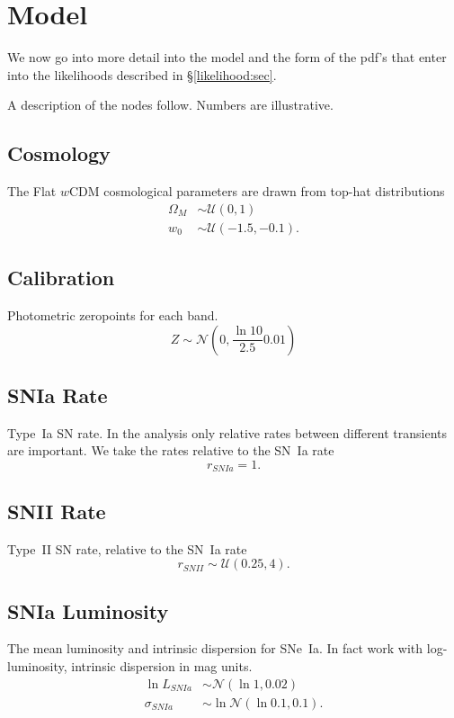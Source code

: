 \documentclass[preprint,3p]{elsarticle}
\begin{document}
\section{Model}
\label{model:sec}

We now go into more detail into the model and the form of the pdf's that enter
into the likelihoods described in \S\ref{likelihood:sec}.

A description of the nodes follow.  Numbers are illustrative. 

\subsection{Cosmology}
The Flat $w$CDM cosmological parameters are drawn from top-hat distributions
\begin{align}
\Omega_M & \sim  {\mathcal{U}}(0,1)\\
w_0 & \sim \mathcal{U}(-1.5, -0.1).
\end{align}


\subsection{Calibration}
Photometric zeropoints for each band.
\begin{equation}
Z \sim \mathcal{N}(0,\frac{\ln{10}}{2.5}0.01)
\end{equation}

\subsection{SNIa Rate}
Type~Ia SN rate. In the analysis only relative rates between different transients are important.
We take the rates relative to the SN~Ia rate
\begin{equation}
r_{SNIa} = 1.
\end{equation}

\subsection{SNII Rate}
Type~II SN rate, relative to the SN~Ia rate
\begin{equation}
r_{SNII} \sim \mathcal{U}(0.25, 4).
\end{equation}

\subsection{SNIa Luminosity}
The mean luminosity and intrinsic dispersion for SNe~Ia. In fact work with log-luminosity, intrinsic
dispersion in mag units.
\begin{align}
\ln{L}_{SNIa} & \sim \mathcal{N}(\ln{1}, 0.02) \\
\sigma_{SNIa} & \sim \ln{\mathcal{N}}(\ln{0.1},0.1).
\end{align}
\end{document}
